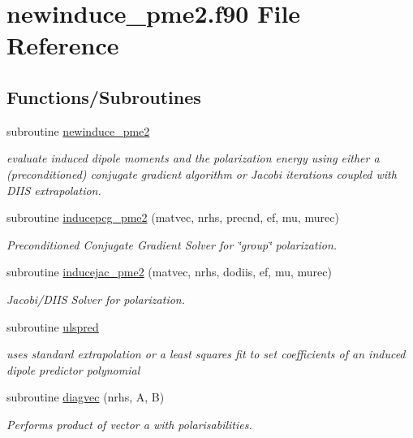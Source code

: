 \hypertarget{newinduce__pme2_8f90}{\section{newinduce\-\_\-pme2.\-f90 File Reference}
\label{newinduce__pme2_8f90}
}
\subsection*{Functions/\-Subroutines}
\begin{DoxyCompactItemize}
\item 
subroutine \hyperlink{newinduce__pme2_8f90_ae757a3b314bc0d9126b3668db3309253}{newinduce\-\_\-pme2}
\begin{DoxyCompactList}\small\item\em evaluate induced dipole moments and the polarization energy using either a (preconditioned) conjugate gradient algorithm or Jacobi iterations coupled with D\-I\-I\-S extrapolation. \end{DoxyCompactList}\item 
subroutine \hyperlink{newinduce__pme2_8f90_ae1dbbe18cb7dad8b9cb81391b6788ef0}{inducepcg\-\_\-pme2} (matvec, nrhs, precnd, ef, mu, murec)
\begin{DoxyCompactList}\small\item\em Preconditioned Conjugate Gradient Solver for \char`\"{}group\char`\"{} polarization. \end{DoxyCompactList}\item 
subroutine \hyperlink{newinduce__pme2_8f90_a1dbaec7ece61f121519f875a324a7ff2}{inducejac\-\_\-pme2} (matvec, nrhs, dodiis, ef, mu, murec)
\begin{DoxyCompactList}\small\item\em Jacobi/\-D\-I\-I\-S Solver for polarization. \end{DoxyCompactList}\item 
subroutine \hyperlink{newinduce__pme2_8f90_a8e991faf62fbdefe7db2a4937e02468d}{ulspred}
\begin{DoxyCompactList}\small\item\em uses standard extrapolation or a least squares fit to set coefficients of an induced dipole predictor polynomial \end{DoxyCompactList}\item 
subroutine \hyperlink{newinduce__pme2_8f90_a172b83c52adea069361b25066abe9ea0}{diagvec} (nrhs, A, B)
\begin{DoxyCompactList}\small\item\em Performs product of vector a with polarisabilities. \end{DoxyCompactList}\end{DoxyCompactItemize}


